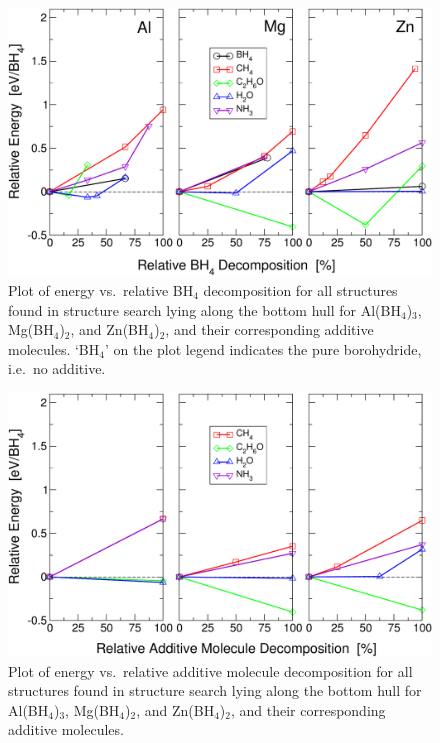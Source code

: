 \documentclass[twocolumn, prb, showpacs]{revtex4-1}
\begin{document}
\begin{figure}
\includegraphics[width=\columnwidth]{BH4_decomposition}
\caption{\label{fig:boro_decom}Plot of energy vs.\ relative BH$_4$ decomposition for all structures
found in structure search
lying along the bottom hull for Al(BH$_4$)$_3$, Mg(BH$_4$)$_2$, and 
Zn(BH$_4$)$_2$, and their corresponding additive molecules. `BH$_4$' on the plot legend indicates the pure
borohydride, i.e.\ no additive.}
\end{figure}


\begin{figure}
\includegraphics[width=\columnwidth]{molecule_decomposition}
\caption{\label{fig:add_decom}Plot of energy vs.\ relative additive molecule decomposition for all structures
found in structure search
lying along the bottom hull for Al(BH$_4$)$_3$, Mg(BH$_4$)$_2$, and 
Zn(BH$_4$)$_2$, and their corresponding additive molecules.}
\end{figure}
\end{document}
